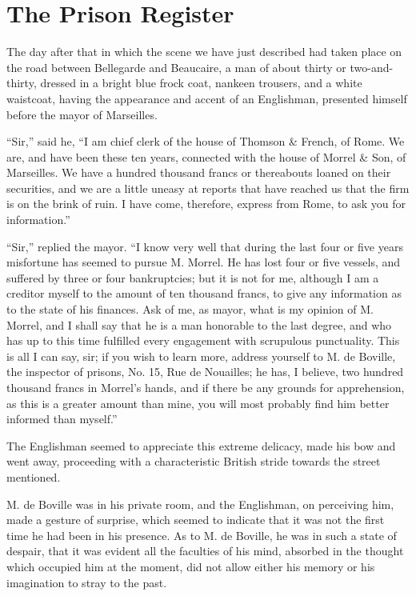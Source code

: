 \chapter{The Prison Register}

The day after that in which the scene we have just described had taken
place on the road between Bellegarde and Beaucaire, a man of about
thirty or two-and-thirty, dressed in a bright blue frock coat, nankeen
trousers, and a white waistcoat, having the appearance and accent of an
Englishman, presented himself before the mayor of Marseilles.

“Sir,” said he, “I am chief clerk of the house of Thomson \& French, of
Rome. We are, and have been these ten years, connected with the house
of Morrel \& Son, of Marseilles. We have a hundred thousand francs or
thereabouts loaned on their securities, and we are a little uneasy at
reports that have reached us that the firm is on the brink of ruin. I
have come, therefore, express from Rome, to ask you for information.”

“Sir,” replied the mayor. “I know very well that during the last four
or five years misfortune has seemed to pursue M. Morrel. He has lost
four or five vessels, and suffered by three or four bankruptcies; but
it is not for me, although I am a creditor myself to the amount of ten
thousand francs, to give any information as to the state of his
finances. Ask of me, as mayor, what is my opinion of M. Morrel, and I
shall say that he is a man honorable to the last degree, and who has up
to this time fulfilled every engagement with scrupulous punctuality.
This is all I can say, sir; if you wish to learn more, address yourself
to M. de Boville, the inspector of prisons, No. 15, Rue de Nouailles;
he has, I believe, two hundred thousand francs in Morrel’s hands, and
if there be any grounds for apprehension, as this is a greater amount
than mine, you will most probably find him better informed than
myself.”

The Englishman seemed to appreciate this extreme delicacy, made his bow
and went away, proceeding with a characteristic British stride towards
the street mentioned.

M. de Boville was in his private room, and the Englishman, on
perceiving him, made a gesture of surprise, which seemed to indicate
that it was not the first time he had been in his presence. As to M. de
Boville, he was in such a state of despair, that it was evident all the
faculties of his mind, absorbed in the thought which occupied him at
the moment, did not allow either his memory or his imagination to stray
to the past.

